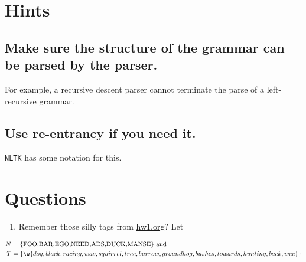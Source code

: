 \documentclass[11pt]{article}
\begin{document}
\section{Hints}
\label{sec:org78456b4}


\subsection{Make sure the structure of the grammar can be parsed by the parser.}
\label{sec:orgf9dddc5}

For example, a recursive descent parser cannot terminate the parse of a
left-recursive grammar.
\subsection{Use re-entrancy if you need it.}
\label{sec:orgc8574ac}

\texttt{NLTK} has some notation for this.
\section{Questions}
\label{sec:org4e774d6}

\begin{enumerate}
\setcounter{enumi}{0}
\item \label{prod-rules} Remember those silly tags from \href{./hw1.org}{hw1.org}?  Let
\end{enumerate}

\begin{align}
N &= \{ \textrm{FOO,BAR,EGO,NEED,ADS,DUCK,MANSE} \} \ \text{and} \nonumber \\
T &= \{ \w{dog, black, racing, was, squirrel, tree, burrow, ground hog, bushes, towards,
hunting, back, wee} \}  \nonumber
\end{align}
\end{document}
